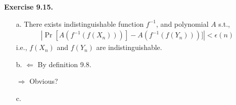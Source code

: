 \documentclass[a4paper]{article}
\newenvironment{exercise}[1]{
	\par
	\noindent\textbf{Exercise #1.}\quad
}{
	\par
	\bigskip
}
\newcommand{\cbra}[1]{\left\{ #1 \right\}}
\newcommand{\bin}{\{0,1\}}
\begin{document}
	\begin{exercise}{9.15}
		\begin{itemize}
			\item [a.] 
				There exists indistinguishable function $f^{-1}$, and polynomial $A$ s.t.,
				\begin{align*}
					|\Pr[A(f^{-1}(f(X_{n})))] - A(f^{-1}(f(Y_{n})))]|<\epsilon(n)
				\end{align*}
				i.e., $f(X_{n})$ and $f(Y_{n})$ are indistinguishable.

			\item[b.] 
				$\Leftarrow$ By definition 9.8.

				$\Rightarrow$ Obvious?

			\item[c.] 

		\end{itemize}
	\end{exercise}

%
\end{document}
